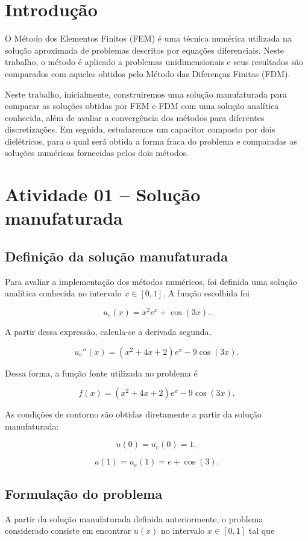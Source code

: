 \section{Introdução}

O Método dos Elementos Finitos (FEM) é uma técnica numérica utilizada na solução aproximada de problemas descritos por equações diferenciais. Neste trabalho, o método é aplicado a problemas unidimensionais e seus resultados são comparados com aqueles obtidos pelo Método das Diferenças Finitas (FDM).

Neste trabalho, inicialmente, construiremos uma solução manufaturada para comparar as soluções obtidas por FEM e FDM com uma solução analítica conhecida, além de avaliar a convergência dos métodos para diferentes discretizações. Em seguida, estudaremos um capacitor composto por dois dielétricos, para o qual será obtida a forma fraca do problema e comparadas as soluções numéricas fornecidas pelos dois métodos.


\section{Atividade 01 -- Solução manufaturada}
\subsection{Definição da solução manufaturada}

Para avaliar a implementação dos métodos numéricos, foi definida uma solução analítica conhecida no intervalo \(x \in [0,1]\). A função escolhida foi

\[
u_e(x)=x^2e^x+\cos(3x).
\]

A partir dessa expressão, calcula-se a derivada segunda,

\[
u_e''(x)
=
(x^2+4x+2)e^x-9\cos(3x).
\]

Dessa forma, a função fonte utilizada no problema é

\[
f(x)
=
(x^2+4x+2)e^x-9\cos(3x).
\]

As condições de contorno são obtidas diretamente a partir da solução manufaturada:

\[
u(0)=u_e(0)=1,
\]

\[
u(1)=u_e(1)=e+\cos(3).
\]

\subsection{Formulação do problema}

A partir da solução manufaturada definida anteriormente, o problema considerado consiste em encontrar \(u(x)\) no intervalo \(x \in [0,1]\) tal que

